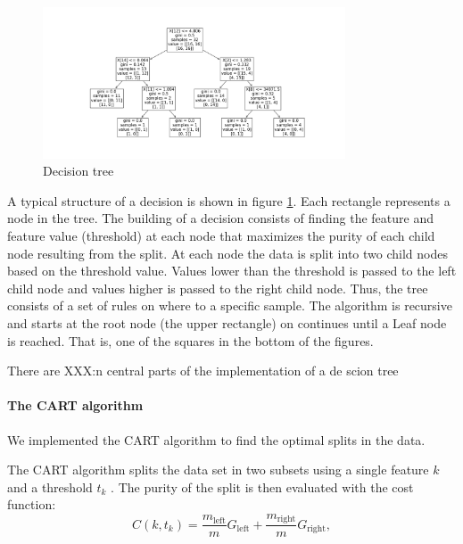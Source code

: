 \begin{figure}[H]
    \centering
    \includegraphics[width=0.8\textwidth]{Figures/descion_tree.png}
    \caption{Decision tree}  
    \label{fig:descision_tree} 
\end{figure}

A typical structure of a decision is shown in figure \ref{fig:descision_tree}. Each rectangle
represents a node in the tree. The building of a decision consists of finding
the feature and feature value (threshold) at each node that maximizes the
purity of each child node resulting from the split. At each node the data is
split into two child nodes based on the threshold value. Values lower than the threshold is
passed to the left child node and values higher is passed to the right child
node. Thus, the tree consists of a set of rules on where to a specific sample. The algorithm is recursive and starts at the
root node (the upper rectangle) on continues until a Leaf node is reached.
That is, one of the squares in the bottom of the figures.     

There are XXX:n central parts of the implementation of a de scion tree

\paragraph{The CART algorithm} \hfill

We implemented the CART algorithm to find the optimal splits in the data.  

The CART algorithm splits the data set in two subsets using a single feature
$k$ and a threshold $t_k$ \cite{w44}. The purity of the split is then evaluated
with the cost function: 
\begin{equation*}
    \label{eq:cart} 
    C(k, t_k) = \frac{m_{\text{left}} }{m} G_{\text{left}}+
    \frac{m_{\text{right}} }{m} G_{\text{right}}, 
\end{equation*}

